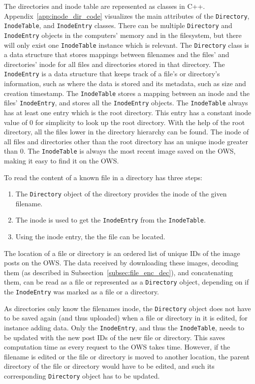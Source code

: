 The directories and inode table are represented as classes in C++. Appendix~\ref{app:inode_dir_code} visualizes the main attributes of the \texttt{Directory}, \texttt{InodeTable}, and \texttt{InodeEntry} classes. There can be multiple \texttt{Directory} and \texttt{InodeEntry} objects in the computers' memory and in the filesystem, but there will only exist one \texttt{InodeTable} instance which is relevant. The \texttt{Directory} class is a data structure that stores mappings between filenames and the files' and directories' inode for all files and directories stored in that directory. The \texttt{InodeEntry} is a data structure that keeps track of a file's or directory's information, such as where the data is stored and its metadata, such as size and creation timestamp. The \texttt{InodeTable} stores a mapping between an inode and the files' \texttt{InodeEntry}, and stores all the \texttt{InodeEntry} objects. The \texttt{InodeTable} always has at least one entry which is the root directory. This entry has a constant inode value of 0 for simplicity to look up the root directory. With the help of the root directory, all the files lower in the directory hierarchy can be found. The inode of all files and directories other than the root directory has an unique inode greater than 0. The \texttt{InodeTable} is always the most recent image saved on the OWS, making it easy to find it on the OWS.

To read the content of a known file in a directory has three steps:
\begin{enumerate}
	\item The \texttt{Directory} object of the directory provides the inode of the given filename.
	\item The inode is used to get the \texttt{InodeEntry} from the \texttt{InodeTable}.
	\item Using the inode entry, the the file can be located.
\end{enumerate}
The location of a file or directory is an ordered list of unique IDs of the image posts on the OWS. The data received by downloading these images, decoding them (as described in Subsection~\ref{subsec:file_enc_dec}), and concatenating them, can be read as a file or represented as a \texttt{Directory} object, depending on if the \texttt{InodeEntry} was marked as a file or a directory. 

As directories only know the filenames inode, the \texttt{Directory} object does not have to be saved again (and thus uploaded) when a file or directory in it is edited, for instance adding data. Only the \texttt{InodeEntry}, and thus the \texttt{InodeTable}, needs to be updated with the new post IDs of the new file or directory. This saves computation time as every request to the OWS takes time. However, if the filename is edited or the file or directory is moved to another location, the parent directory of the file or directory would have to be edited, and such its corresponding \texttt{Directory} object has to be updated.

